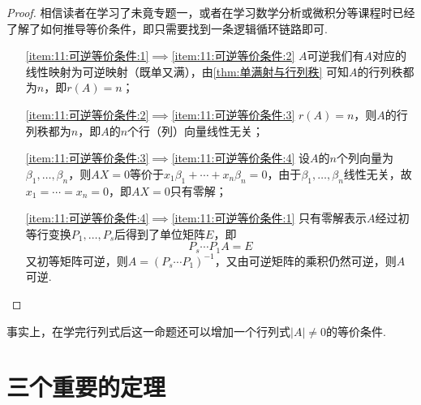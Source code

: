 \begin{proof}
    相信读者在学习了未竟专题一，或者在学习数学分析或微积分等课程时已经了解了如何推导等价条件，即只需要找到一条逻辑循环链路即可.
    \begin{itemize}
        \item[\ref*{item:11:可逆等价条件:1}$\implies$\ref*{item:11:可逆等价条件:2}] $A$可逆我们有$A$对应的线性映射为可逆映射（既单又满），由\autoref{thm:单满射与行列秩} 可知$A$的行列秩都为$n$，即$r(A)=n$；

        \item[\ref*{item:11:可逆等价条件:2}$\implies$\ref*{item:11:可逆等价条件:3}] $r(A)=n$，则$A$的行列秩都为$n$，即$A$的$n$个行（列）向量线性无关；

        \item[\ref*{item:11:可逆等价条件:3}$\implies$\ref*{item:11:可逆等价条件:4}] 设$A$的$n$个列向量为$\beta_1,\ldots,\beta_n$，则$AX=0$等价于$x_1\beta_1+\cdots+x_n\beta_n=0$，由于$\beta_1,\ldots,\beta_n$线性无关，故$x_1=\cdots=x_n=0$，即$AX=0$只有零解；

        \item[\ref*{item:11:可逆等价条件:4}$\implies$\ref*{item:11:可逆等价条件:1}] 只有零解表示$A$经过初等行变换$P_1,\ldots,P_s$后得到了单位矩阵$E$，即
              \[P_s\cdots P_1A=E\]
              又初等矩阵可逆，则$A=(P_s\cdots P_1)^{-1}$，又由可逆矩阵的乘积仍然可逆，则$A$可逆.
    \end{itemize}
\end{proof}

事实上，在学完行列式后这一命题还可以增加一个行列式$|A|\neq 0$的等价条件.

\section{三个重要的定理}

